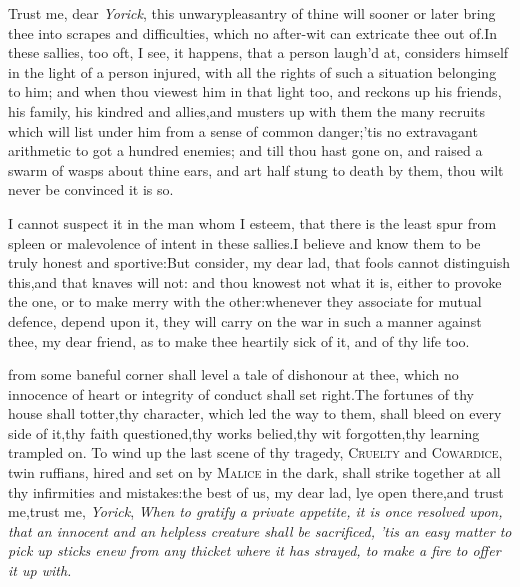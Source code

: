 \documentclass{article}
\begin{document}
Trust me, dear \textit{Yorick}, this unwary\break pleasantry of thine
will sooner or later bring thee into scrapes and difficulties,
which no after-wit can extricate thee out of.\tsh  In these
sallies, too oft, I see, it happens, that a person laugh’d at,
considers himself in the light of a person injured, with all the
rights of such a situa\-tion belonging to him; and when thou viewest
him in that light too, and rec\-kons up his friends, his family, his
kindred and allies,\tsk  and musters up with them the many
recruits which will list under him from a sense of common
danger;\tsk  ’tis no extravagant arithmetic to
got a hundred enemies; and till
thou hast gone on, and raised a swarm of wasps about thine ears,
and art half stung to death by them, thou wilt never be
convinced it is so.

I cannot suspect it in the man whom I esteem, that there is the
least spur from spleen or malevolence of intent in these
sallies.\tsk  I believe and know them to be truly honest and
sportive:\tsk  But consider, my dear lad, that fools cannot
distinguish this,\tsk  and that knaves will not: and thou knowest
not what it is, either to provoke the one, or to make merry with
the other:\tsh  whenever they associate for mutual defence,
depend upon it, they will carry on the war in such a manner against
thee, my dear friend, as to make thee heartily sick of it, and of
thy life too.

 from some baneful corner shall level a tale of dishonour at
thee,
which no innocence of heart or integrity of conduct shall set right.\tsh  The
fortunes of thy house shall totter,\tsk  thy character, which led the way to them,
shall bleed on every side of it,\tsk  thy faith questioned,\tsk  thy works
belied,\tsk  thy wit forgotten,\tsk  thy learning trampled on. To wind up the last
scene of thy tragedy, \textsc{Cruelty} and \textsc{Cowardice}, twin ruffians, hired
and set on by \textsc{Malice} in the dark, shall strike together at all thy
infirmities and mistakes:\tsh  the best of us, my dear lad, lye open there,\tsk  and
trust me,\tsk\break  trust me, \textit{Yorick}, \textit{When to gratify a private appetite, it is
once resolved upon, that an innocent and an helpless creature shall be sacrificed,
’tis an easy matter to pick up sticks enew from any thicket where it has strayed,
to make a fire to offer it up with.}
\end{document}
